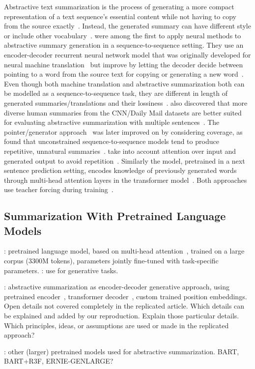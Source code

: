 Abstractive text summarization is the process of generating a more compact representation of a text sequence's essential content while not having to copy from the source exactly~\cite[28]{Torres-Moreno2014}. Instead, the generated summary can have different style or include other vocabulary~\cite{NallapatiZSGX2016}.
\citeauthor{NallapatiZSGX2016} were among the first to apply neural methods to abstractive summary generation in a sequence-to-sequence setting. They use an encoder-decoder recurrent neural network model that was originally developed for neural machine translation~\cite{https://arxiv.org/abs/1409.0473} but improve by letting the decoder decide between pointing to a word from the source text for copying or generating a new word~\cite{NallapatiZSGX2016}.
Even though both machine translation and abstractive summarization both can be modelled as a sequence-to-sequence task, they are different in length of generated summaries/translations and their lossiness~\cite{NallapatiZSGX2016}.
\citeauthor{NallapatiZSGX2016} also discovered that more diverse human summaries from the CNN/Daily Mail datasets are better suited for evaluating abstractive summarization with multiple sentences~\cite{NallapatiZSGX2016,HermannKGEKSB2015}.
The pointer/generator approach~\cite{NallapatiZSGX2016} was later improved on by considering coverage, as \citeauthor{SeeLM2017} found that unconstrained sequence-to-sequence models tend to produce repetitive, unnatural summaries~\cite{SeeLM2017,PaulusXS2018}.
\citeauthor{PaulusXS2018} take into account attention over input and generated output to avoid repetition~\cite{PaulusXS2018}.
Similarly the \Bert model, pretrained in a next sentence prediction setting, encodes knowledge of previously generated words through multi-head attention layers in the transformer model~\cite{DevlinCLT2019}.
Both approaches use teacher forcing during training~\cite{PaulusXS2018,DevlinCLT2019}.

\subsection{Summarization With Pretrained Language Models}

\citeauthor{DevlinCLT2019}: pretrained language model, based on multi-head attention~\cite{VaswaniSPUJGKP2017}, trained on a large corpus (3300M tokens), \Bert parameters jointly fine-tuned with task-specific parameters.
\citeauthor{Edunov2019?,Rothe2019?}: use \Bert for generative tasks.

\citeauthor{LiuL2019}: abstractive summarization as encoder-decoder generative approach, using pretrained \Bert encoder~\cite{DevlinCLT2019}, transformer decoder~\cite{VaswaniSPUJGKP2017}, custom trained position embeddings.
Open details not covered completely in the replicated article.
Which details can be explained and added by our reproduction.
Explain those particular details.
Which principles, ideas, or assumptions are used or made in the replicated approach?

\citeauthor{???}: other (larger) pretrained models used for abstractive summarization.
BART, BART+R3F, ERNIE-GENLARGE?
